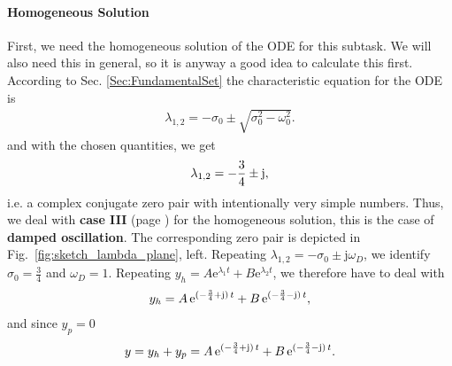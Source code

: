 \documentclass[11pt,a4paper,DIV=12]{scrartcl}
\begin{document}
\paragraph{Homogeneous Solution}
\label{Sec:TaskaHomo}
First, we need the homogeneous solution of the ODE for this subtask.
%
We will also need this in general, so it is anyway a good idea to calculate
this first.
%
According to Sec. \ref{Sec:FundamentalSet} the characteristic equation for the
ODE is 
\begin{align}
\lambda_{1,2} = -\sigma_0 \pm \sqrt{\sigma_0^2 - \omega_0^2}.
\end{align}
and with the chosen quantities, we get
\begin{align}
\lambda_{1,2} = -\frac{3}{4} \pm \im,
\end{align}
i.e. a complex conjugate zero pair with intentionally very simple numbers.
Thus, we deal with \textbf{case III} (page \pageref{pg:caseIII})
for the homogeneous solution, this is the case of \textbf{damped oscillation}.
The corresponding zero pair is depicted in Fig.~\ref{fig:sketch_lambda_plane},
left.
%
Repeating 
$\lambda_{1,2} = -\sigma_0 \pm \mathrm{j}\omega_D$,
we identify $\sigma_0 = \frac{3}{4}$ and $\omega_D = 1$.
Repeating 
$y_h = A \mathrm{e}^{\lambda_1 t} + B \mathrm{e}^{\lambda_2 t}$,
we therefore have to deal with
\begin{align}
y_h = A \, \mathrm{e}^{(-\frac{3}{4}+\im)\,t} + B \, \mathrm{e}^{(-\frac{3}{4}-\im)\,t},
\end{align}
and since $y_p=0$
\begin{align}
y = y_h + y_p = A \, \mathrm{e}^{(-\frac{3}{4}+\im)\,t} + B \, \mathrm{e}^{(-\frac{3}{4}-\im)\,t}.
\end{align}
\end{document}
